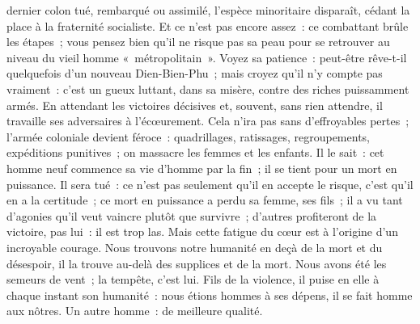 \documentclass[french,twoside]{book} %
\newcommand{\astermono}{\medskip\centerline{\color{rubric}\large\selectfont{\syms ✻}}\medskip\par}%
\begin{document}
dernier colon tué, rembarqué ou assimilé, l’espèce minoritaire disparaît, cédant la place à la fraternité socialiste. Et ce n’est pas encore assez : ce combattant brûle les étapes ; vous pensez bien qu’il ne risque pas sa peau pour se retrouver au niveau du vieil homme « métropolitain ». Voyez sa patience : peut-être rêve-t-il quelquefois d’un nouveau Dien-Bien-Phu ; mais croyez qu’il n’y compte pas vraiment : c’est un gueux luttant, dans sa misère, contre des riches puissamment armés. En attendant les victoires décisives et, souvent, sans rien attendre, il travaille ses adversaires à l’écœurement. Cela n’ira pas sans d’effroyables pertes ; l’armée coloniale devient féroce : quadrillages, ratissages, regroupements, expéditions punitives ; on massacre les femmes et les enfants. Il le sait : cet homme neuf commence sa vie d’homme par la fin ; il se tient pour un mort en puissance. Il sera tué : ce n’est pas seulement qu’il en accepte le risque, c’est qu’il en a la certitude ; ce mort en puissance a perdu sa femme, ses fils ; il a vu tant d’agonies qu’il veut vaincre plutôt que survivre ; d’autres profiteront de la victoire, pas lui : il est trop las. Mais cette fatigue du cœur est à l’origine d’un incroyable courage. Nous trouvons notre humanité en deçà de la mort et du désespoir, il la trouve au-delà des supplices et de la mort. Nous avons été les semeurs de vent ; la tempête, c’est lui. Fils de la violence,   il puise en elle à chaque instant son humanité : nous étions hommes à ses dépens, il se fait homme aux nôtres. Un autre homme : de meilleure qualité.\par

\astermono
\end{document}
